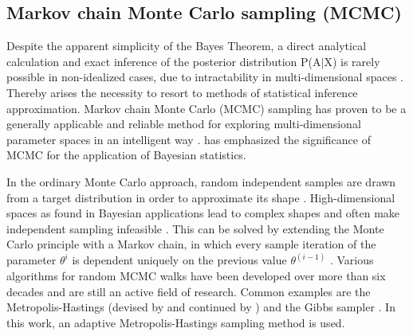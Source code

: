        \subsection{Markov chain Monte Carlo sampling (MCMC)}
        Despite the apparent simplicity of the Bayes Theorem, a direct analytical calculation and exact inference of the posterior distribution P(A$|$X) is rarely possible in non-idealized cases, due to intractability in multi-dimensional spaces \citep{hoffman2014no, delaVarga2016}. Thereby arises the necessity to resort to methods of statistical inference approximation. Markov chain Monte Carlo (MCMC) sampling has proven to be a generally applicable and reliable method for exploring multi-dimensional parameter spaces in an intelligent way \citep{hoffman2014no, davidson2015}. \citet{gilks2005mcmc} has emphasized the significance of MCMC for the application of Bayesian statistics.
        
        In the ordinary Monte Carlo approach, random independent samples are drawn from a target distribution in order to approximate its shape \citep{gilks2005mcmc}. High-dimensional spaces as found in Bayesian applications lead to complex shapes and often make independent sampling infeasible \citep{gilks2005mcmc}. This can be solved by extending the Monte Carlo principle with a Markov chain, in which every sample iteration of the parameter $\theta^i$ is dependent uniquely on the previous value $\theta^{(i-1)}$ \citep{gilks2005mcmc, delaVarge2016}.
        Various algorithms for random MCMC walks have been developed over more than six decades and are still an active field of research. Common examples are the Metropolis-Hastings (devised by \citet{metropolis1953equation} and continued by \citet{hastings1970}) and the Gibbs sampler \citep{geman1984stochastic}.
        In this work, an adaptive Metropolis-Hastings sampling method is used.
                
